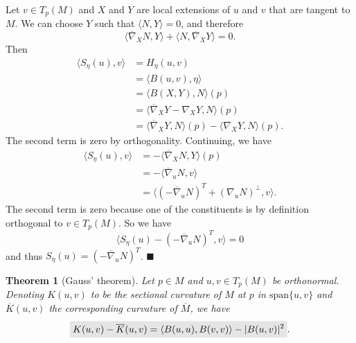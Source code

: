 \documentclass[letter-paper]{tufte-book}
\newtheorem{theorem}{\color{pastel-blue}Theorem}[section]
\newenvironment{proof}[1][Proof]{\begin{trivlist}
\item[\hskip \labelsep {\bfseries #1}]}{\end{trivlist}}
\newcommand{\qed}{\hfill$\blacksquare$}
\newcommand{\highlight}[1]{\mathchoice%
  {\colorbox{black!10}{$\displaystyle#1$}}%
  {\colorbox{black!10}{$\textstyle#1$}}%
  {\colorbox{black!10}{$\scriptstyle#1$}}%
  {\colorbox{black!10}{$\scriptscriptstyle#1$}}}%
\begin{document}
\begin{proof}
  Let $v\in T_p(M)$ and $X$ and $Y$ are local extensions of $u$ and $v$ that are tangent to $M$. We can choose $Y$ such that $\langle N, Y\rangle =0$, and therefore
  \begin{equation*}
    \langle \overline{\nabla}_X N, Y\rangle + \langle N, \overline{\nabla}_X Y\rangle = 0.
  \end{equation*}
  Then
  \begin{align*}
    \langle S_\eta(u), v\rangle
      &= H_\eta(u,v)\\
      &= \langle B(u,v), \eta\rangle\\
      &= \langle B(X,Y), N\rangle(p)\\
      &= \langle \overline{\nabla}_X Y - \nabla_X Y, N\rangle(p)\\
      &= \langle \overline{\nabla}_X Y, N\rangle(p) - \langle \nabla_X Y, N\rangle(p).
  \end{align*}
  The second term is zero by orthogonality. Continuing, we have
  \begin{align*}
    \langle S_\eta(u), v\rangle
      &= -\langle \overline{\nabla}_X N, Y\rangle(p)\\
      &= -\langle \overline{\nabla}_u N, v \rangle\\
      &= \langle (-\overline{\nabla}_u N)^T + (\nabla_u N)^\perp, v\rangle.
  \end{align*}
  The second term is zero because one of the constituents is by definition orthogonal to $v\in T_p(M)$. So we have
  \begin{equation*}
    \langle S_\eta(u) - (-\overline{\nabla}_u N)^T, v\rangle = 0
  \end{equation*}
  and thus $S_\eta(u) = (-\overline{\nabla}_u N)^T$. \qed
\end{proof}

\begin{theorem}[Gauss' theorem]
  Let $p\in M$ and $u,v \in T_p(M)$ be orthonormal. Denoting $K(u,v)$ to be the sectional curvature of $M$ at $p$ in $\mbox{span}\{u,v\}$ and $\overline{K}(u,v)$ the corresponding curvature of $\overline{M}$, we have
  \begin{equation}
    \highlight{K(u,v) - \overline{K}(u,v) = \langle B(u,u), B(v,v)\rangle - |B(u,v)|^2}.
  \end{equation}
\end{theorem}
\end{document}
